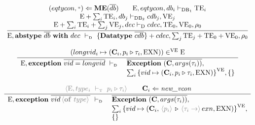 \documentclass[11pt,a4paper]{article}
\newcommand{\key}[1]{\textrm{\textbf{#1}}}
\newcommand{\qualtype}[2]{#1 \triangleright #2}
\newcommand{\braced}[1]{\{#1\}}
\newcommand{\angled}[1]{\,{\color{gray}\langle#1\rangle}\,}
\newcommand{\wildcard}{{\color{gray}\scriptstyle\textbf{*}}}
\newcommand{\Env}  {\textrm{E}}
\newcommand{\VE}   {\textrm{VE}}
\newcommand{\TE}   {\textrm{TE}}
\newcommand{\Dec}  {\textrm{D}}
\newcommand{\DB}   {\textrm{DB}}
\newcommand{\VKE}  {\textrm{EXN}}
\newcommand{\vcon} {\mathbf{C}}
\newcommand{\Empty}{\braced{}}
\newcommand{\vdashD}  {\ \vdash_{\textrm{\tiny D}}\  }
\newcommand{\vdashT}  {\ \vdash_{\textrm{\tiny T}}\  }
\newcommand{\MaximizeEq}{\key{ME}}
\newcommand{\corenew}[1]{\textit{new\_#1}}
\newcommand{\vect}[1]{\overline{#1}}
\begin{document}
\[
\cfrac
 {\begin{array}{c}
  (eqtycon,\wildcard)\Leftarrow \MaximizeEq(\vect{db})						 \qquad
   \Env,eqtycon,db_{i} \vdash_{\DB_1} \TE_i 									 \\ 
   \Env+\sum_i{\TE_i},db_j \vdash_{\DB_2} cdb_j,\VE_j       					 \\
  \Env+\sum_i{\TE_i}+\sum_j{\VE_j}, dec \vdash_{\Dec} cdec, \TE_0,\VE_0,\rho_0 \\
  \end{array}}
 {\Env, \key{abstype}\ \vect{db}\ \key{with}\ dec \vdashD \braced{\key{Datatype}\ \vect{cdb}}+cdec, \sum_{j}\TE_j+\TE_0+\VE_0, \rho_0}
\]

\[
\cfrac
 {(longvid_i \mapsto (\vcon_i, \qualtype{p_i}{\tau_i}, \VKE)) \in^\VE \Env }
 {\begin{array}{ll}
  \Env, \key{exception}\ \vect{vid = longvid} \vdashD & \vect{\key{Exception}\ (\vcon,args(\tau_i))}, \\
  & \sum_i{\braced{vid \mapsto (\vcon_i, \qualtype{p_i}{\tau_i}, \VKE)}}^\VE , \Empty \\
  \end{array}}
\]

\[
\cfrac
 {\angled{\Env,type_i \vdashT \qualtype{p_i}{\tau_i}} \qquad \vcon_i\Leftarrow\corenew{vcon}}
 {\begin{array}{ll}
  \Env, \key{exception}\ \vect{vid \angled{\key{of}\ type}} \vdashD & \vect{\key{Exception}\ (\vcon,args(\tau_i))}, \\
  & \sum_i{\braced{vid \mapsto (\vcon_i, \qualtype{\angled{p_i}}{\angled{\tau_i \to} exn, \VKE)}}}^\VE , \\
  & \Empty \\
  \end{array}}
\]
\end{document}
